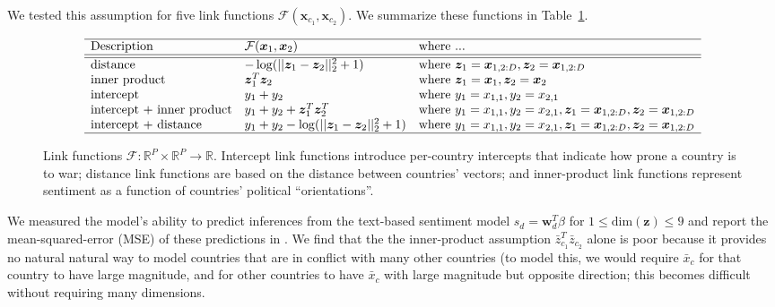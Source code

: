 We tested this assumption for five link functions $\mathcal{F}(\bm
x_{c_1}, \bm x_{c_2})$.  We summarize these functions in Table~\ref{table:fr_link_functions}.
\begin{figure}
\begin{align}
    \begin{array}{lll}
      \hline
      \mbox{Description} & \mathcal{F}(\bm x_1, \bm x_2) & \mbox{where ...} \\
      \hline
      \hline
      \mbox{distance} & -\log(|| \bm z_{1} - \bm
      z_{2} ||_2^2 + 1) & \mbox{where } \bm z_{1} = \bm x_{1,2:D}, \bm z_2 = \bm x_{1,2:D} \\
     \mbox{inner product} & \bm z_{1}^T \bm z_{2} & \mbox{where } \bm z_{1} = \bm x_{1}, \bm z_2 = \bm x_{2} \\
     \mbox{intercept} & y_1 + y_2 & \mbox{where } y_1 = x_{1,1}, y_2 = x_{2,1} \\
     \mbox{intercept + inner product} & y_1 + y_2 + \bm z_{1}^T \bm
     z_{2}^T & \mbox{where } y_1 = x_{1,1}, y_2 = x_{2,1}, \bm z_{1}
     = \bm x_{1,2:D}, \bm z_2 = \bm x_{1,2:D} \\
     \mbox{intercept + distance} & y_1 + y_2 - \log(|| \bm z_{1} - \bm
     z_{2} ||_2^2 + 1) & \mbox{where } y_1 = x_{1,1}, y_2 = x_{2,1}, \bm z_{1}
     = \bm x_{1,2:D}, \bm z_2 = \bm x_{1,2:D} \\
     \hline
    \end{array} \\
\end{align}
\label{table:fr_link_functions}
\caption{Link functions $\mathcal{F}: \mathbb{R}^P \times \mathbb{R}^P
  \rightarrow \mathbb{R}$.  Intercept link functions introduce
  per-country intercepts that indicate how prone a country is to war;
  distance link functions are based on the distance between countries'
  vectors; and inner-product link functions represent sentiment as a
  function of countries' political ``orientations''.}
\end{figure}

We measured the model's ability to predict inferences from the
text-based sentiment model $s_d = \bm w_d^T \beta$ for $1 \le
\mbox{dim}(\bm z) \le 9$ and report the mean-squared-error (MSE) of
these predictions in .  We find that
the the inner-product assumption $\bar z_{c_1}^T \bar z_{c_2}$ alone
is poor because it provides no natural natural way to model countries that are
in conflict with many other countries (to model this, we
would require $\bar x_c$ for that country to have large magnitude,
and for other countries to have $\bar x_c$ with large magnitude
but opposite direction; this becomes difficult without requiring many
dimensions.

